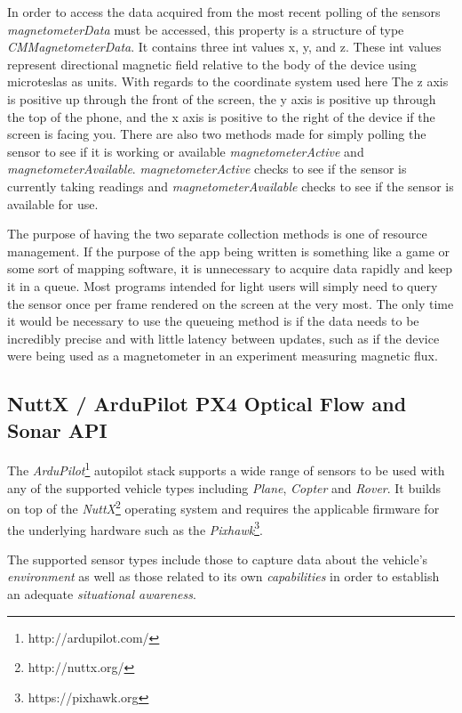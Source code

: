 \documentclass[paper=letter, fontsize=11pt]{scrartcl}
\numberwithin{equation}{section}
\numberwithin{figure}{section}
\numberwithin{table}{section}
\begin{document}
\par
In order to access the data acquired from the most recent polling of the sensors {\em
magnetometerData} must be accessed, this property is a structure of type
{\em CMMagnetometerData}. It contains three int values x, y, and z. These int
values represent directional magnetic field relative to the body of the device
using microteslas as units. With regards to the coordinate system used here The z
axis is positive up through the front of the screen, the y axis is positive up
through the top of the phone, and the x axis is positive to the right of the device
if the screen is facing you. There are also two methods made for simply polling the
sensor to see if it is working or available {\em magnetometerActive} and 
{\em magnetometerAvailable}. {\em magnetometerActive} checks to see if the sensor
is currently taking readings and {\em magnetometerAvailable} checks to see if the sensor is
available for use.

\par
The purpose of having the two separate collection methods is one of resource
management. If the purpose of the app being written is something like a game or
some sort of mapping software, it is unnecessary to acquire data rapidly and
keep it in a queue. Most programs intended for light users will simply need to
query the sensor once per frame rendered on the screen at the very most. The
only time it would be necessary to use the queueing method is if the data needs to be incredibly
precise and with little latency between updates, such as if the device were
being used as a magnetometer in an experiment measuring magnetic flux.

\subsection{NuttX / ArduPilot PX4 Optical Flow and Sonar API}
\label{ardupilot_flow_api}
\par
The {\em ArduPilot}\footnote{http://ardupilot.com/} autopilot stack supports a
wide range of sensors to be used with any of the supported vehicle types
including {\em Plane}, {\em Copter} and {\em Rover}. It builds on top of the
{\em NuttX}\footnote{http://nuttx.org/} operating system and requires the
applicable firmware for the underlying hardware such as the
{\em Pixhawk}\footnote{https://pixhawk.org}.

\par
The supported sensor types include those to capture data about the vehicle's
{\em environment} as well as those related to its own {\em capabilities} in
order to establish an adequate {\em situational awareness}.
\end{document}

